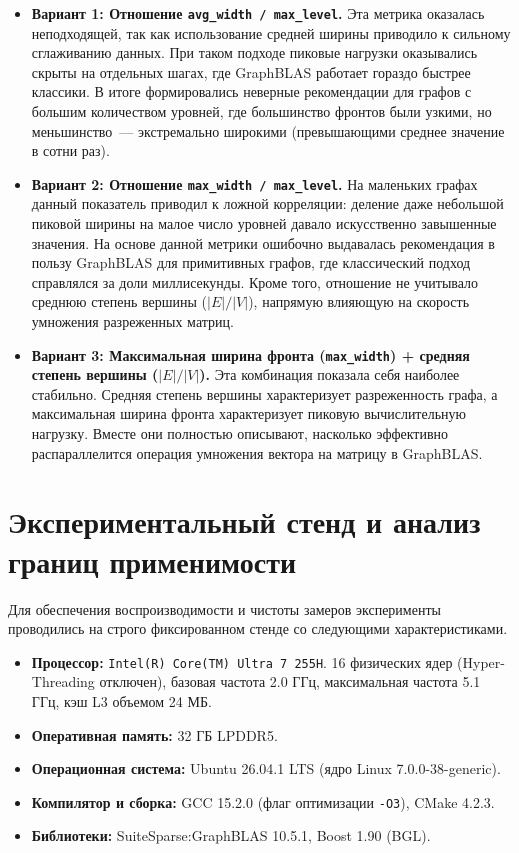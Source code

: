 \documentclass[a4paper]{article}
\begin{document}
\begin{itemize}

    \item \textbf{Вариант 1: Отношение \texttt{avg\_width / max\_level}.} Эта метрика оказалась неподходящей, так как использование средней ширины приводило к сильному сглаживанию данных. При таком подходе пиковые нагрузки оказывались скрыты на отдельных шагах, где GraphBLAS работает гораздо быстрее классики. В итоге формировались неверные рекомендации для графов с большим количеством уровней, где большинство фронтов были узкими, но меньшинство~--- экстремально широкими (превышающими среднее значение в сотни раз).

    \item \textbf{Вариант 2: Отношение \texttt{max\_width / max\_level}.} На маленьких графах данный показатель приводил к ложной корреляции: деление даже небольшой пиковой ширины на малое число уровней давало искусственно завышенные значения. На основе данной метрики ошибочно выдавалась рекомендация в пользу GraphBLAS для примитивных графов, где классический подход справлялся за доли миллисекунды. Кроме того, отношение не учитывало среднюю степень вершины ($|E|/|V|$), напрямую влияющую на скорость умножения разреженных матриц.

    \item \textbf{Вариант 3: Максимальная ширина фронта (\texttt{max\_width}) + средняя степень вершины ($|E|/|V|$).} Эта комбинация показала себя наиболее стабильно. Средняя степень вершины характеризует разреженность графа, а максимальная ширина фронта характеризует пиковую вычислительную нагрузку. Вместе они полностью описывают, насколько эффективно распараллелится операция умножения вектора на матрицу в GraphBLAS.

\end{itemize}

\section{Экспериментальный стенд и анализ границ применимости}

Для обеспечения воспроизводимости и чистоты замеров эксперименты проводились на строго фиксированном стенде со следующими характеристиками.

\begin{itemize}
    \item \textbf{Процессор:} \texttt{Intel(R) Core(TM) Ultra 7 255H}. 16 физических ядер (Hyper-Threading отключен), базовая частота 2.0 ГГц, максимальная частота 5.1 ГГц, кэш L3 объемом 24 МБ.
    \item \textbf{Оперативная память:} 32 ГБ LPDDR5.
    \item \textbf{Операционная система:} Ubuntu 26.04.1 LTS (ядро Linux 7.0.0-38-generic).
    \item \textbf{Компилятор и сборка:} GCC 15.2.0 (флаг оптимизации \texttt{-O3}), CMake 4.2.3.
    \item \textbf{Библиотеки:} SuiteSparse:GraphBLAS 10.5.1, Boost 1.90 (BGL).
\end{itemize}
\end{document}
